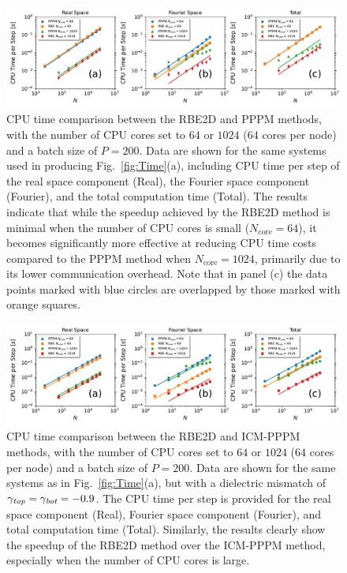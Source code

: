 \begin{figure}[!ht]
\begin{center}
\includegraphics[width=1\textwidth]{figs/time_compare_nonsub.pdf}
\caption{CPU time comparison between the RBE2D and PPPM methods, with the number of CPU cores set to $64$ or $1024$ ($64$ cores per node) and a batch size of $P=200$. Data are shown for the same systems used in producing Fig.~\ref{fig:Time}(a), including CPU time per step of the real space component (Real), the Fourier space component (Fourier), and the total computation time (Total).
The results indicate that while the speedup achieved by the RBE2D method is minimal when the number of CPU cores is small ($N_{\mathrm{core}} = 64$), it becomes significantly more effective at reducing CPU time costs compared to the PPPM method when $N_{\mathrm{core}} = 1024$, primarily due to its lower communication overhead.
Note that in panel (c) the data points marked with blue circles are overlapped by those marked with orange squares.}
\label{fig:timenondie}
\end{center} 
\end{figure}

\begin{figure}[!ht]
\begin{center}
\includegraphics[width=1\textwidth]{figs/time_compare_withsub.pdf}
\caption{ {CPU time comparison between the RBE2D and ICM-PPPM methods, with the number of CPU cores set to $64$ or $1024$ ($64$ cores per node) and a batch size of $P=200$. Data are shown for the same systems as in Fig.~\ref{fig:Time}(a), but with a dielectric mismatch of $\gamma_{\emph{top}} = \gamma_{\emph{bot}} = -0.9$. The CPU time per step is provided for the real space component (Real), Fourier space component (Fourier), and total computation time (Total).
Similarly, the results clearly show the speedup of the RBE2D method over the ICM-PPPM method, especially when the number of CPU cores is large.}}
\label{fig:timedie}
\end{center} 
\end{figure}